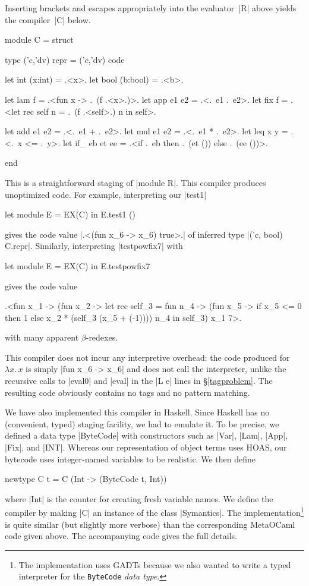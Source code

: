 \documentclass[preprint]{sigplanconf}
\newcommand{\fun}[1]{\mathopen{\lambda\mathord{#1}.\,}}
\begin{document}
Inserting brackets and escapes appropriately into the
evaluator~|R| above yields the compiler~|C| below.
\begin{code}
module C = struct

  type ('c,'dv) repr = ('c,'dv) code

  let int (x:int)   = .<x>.
  let bool (b:bool) = .<b>.

  let lam f         = .<fun x -> .~(f .<x>.)>.
  let app e1 e2     = .<.~e1 .~e2>.
  let fix f = 
    .<let rec self n = .~(f .<self>.) n in self>.

  let add e1 e2     = .<.~e1 + .~e2>.
  let mul e1 e2     = .<.~e1 * .~e2>.
  let leq x y       = .<.~x <= .~y>.
  let if_ eb et ee = 
    .<if .~eb then .~(et ()) else .~(ee ())>.

end
\end{code}
This is a straightforward staging of
|module R|.
This compiler produces
unoptimized code. For example, interpreting our |test1|
\begin{code}
let module E = EX(C) in E.test1 ()
\end{code}
gives the code value |.<(fun x_6 -> x_6) true>.|
of inferred type |('c, bool) C.repr|.  Similarly, interpreting |testpowfix7|
with
\begin{code}
let module E = EX(C) in E.testpowfix7
\end{code}
gives the code value
\begin{code}
.<fun x_1 -> (fun x_2 ->
  let rec self_3 = fun n_4 ->
   (fun x_5 -> if x_5 <= 0 then 1 
               else x_2 * (self_3 (x_5 + (-1))))
   n_4
  in self_3) x_1 7>.
\end{code}
with many apparent $\beta$-redexes.

This compiler does not incur
any interpretive overhead: the
code produced for $\fun{x}x$ is simply |fun x_6 -> x_6| and does not
  call the interpreter, unlike the recursive calls to |eval0| and
  |eval| in the |L e| lines in \S\ref{tagproblem}.
The resulting code obviously contains no tags and no pattern matching.

We have also implemented this compiler in Haskell. Since Haskell
has no (convenient, typed) staging facility, we had to emulate
it. To be precise, we defined a data type |ByteCode| with
constructors such as |Var|, |Lam|, |App|, |Fix|, and |INT|.
Whereas our representation of object terms uses HOAS,
our bytecode uses integer-named
variables to be realistic. We then define 
\begin{code}
newtype C t = C (Int -> (ByteCode t, Int)) 
\end{code}
where |Int| is the counter for creating fresh variable
names. We define the compiler by making |C| an instance of the
class |Symantics|. The implementation\footnote{The implementation uses
GADTs because we also wanted to write a typed interpreter for 
the \texttt{ByteCode} \emph{data type}.} is quite similar (but slightly more
verbose) than the corresponding MetaOCaml code given above. The
accompanying code gives the full details.
\end{document}
